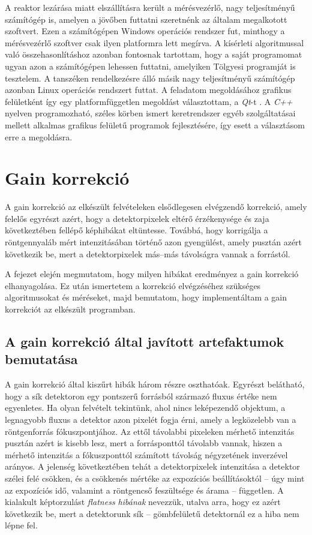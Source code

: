 \documentclass[a4paper,12pt]{article}
\begin{document}
A reaktor lezárása miatt elszállításra került a mérésvezérlő, nagy teljesítményű  számítógép is, amelyen a jövőben futtatni szeretnénk az általam megalkotott szoftvert.  Ezen a számítógépen Windows operációs rendszer fut, minthogy a mérésvezérlő szoftver csak ilyen platformra lett megírva. A kísérleti algoritmussal való összehasonlításhoz azonban fontosnak tartottam, hogy a saját programomat ugyan azon a számítógépen lehessen futtatni, amelyiken Tölgyesi programját is tesztelem. A tanszéken rendelkezésre álló másik nagy teljesítményű számítógép azonban Linux operációs rendszert futtat. A feladatom megoldásához grafikus felületként így egy platformfüggetlen megoldást választottam, a \emph{Qt}-t \cite{qt}. A \emph{C++} nyelven programozható, széles körben ismert keretrendszer egyéb szolgáltatásai mellett alkalmas grafikus felületű programok  fejlesztésére, így esett a választásom erre a megoldásra.




\section{Gain korrekció}
\label{sec:gainkorr}


A gain korrekció az elkészült felvételeken elsődlegesen elvégzendő korrekció, amely felelős egyrészt azért, hogy a detektorpixelek eltérő érzékenysége és zaja következtében fellépő képhibákat eltüntesse. Továbbá, hogy korrigálja a röntgennyaláb mért intenzitásában történő azon gyengülést, amely pusztán azért következik be, mert a detektorpixelek más--más távolságra vannak a forrástól.

A fejezet elején megmutatom, hogy milyen hibákat eredményez a gain korrekció elhanyagolása. Ez után ismertetem a korrekció elvégzéséhez szükséges algoritmusokat és méréseket, majd bemutatom, hogy implementáltam a gain korrekciót az elkészült programban. 

\subsection{A gain korrekció által javított artefaktumok bemutatása}

A gain korrekció által kiszűrt hibák három részre oszthatóak. Egyrészt belátható, hogy a sík detektoron egy pontszerű forrásból származó fluxus értéke nem egyenletes. Ha olyan felvételt tekintünk, ahol nincs leképezendő objektum, a legnagyobb fluxus a detektor azon pixelét fogja érni, amely a legközelebb van a röntgenforrás fókuszpontjához. Az ettől távolabbi pixeleken mérhető intenzitás pusztán azért is kisebb lesz, mert a forrásponttól távolabb vannak, hiszen a mérhető intenzitás a fókuszponttól számított távolság négyzetének inverzével arányos. A jelenség következtében tehát a detektorpixelek intenzitása a detektor szélei felé csökken, és a csökkenés mértéke az expozíciós beállításoktól -- úgy mint az expozíciós idő, valamint a röntgencső feszültsége és árama -- független. A kialakult képtorzulást \emph{flatness hibának} nevezzük, utalva arra, hogy ez azért következik be, mert a detektorunk sík -- gömbfelületű detektornál ez a hiba nem lépne fel.
\end{document}
